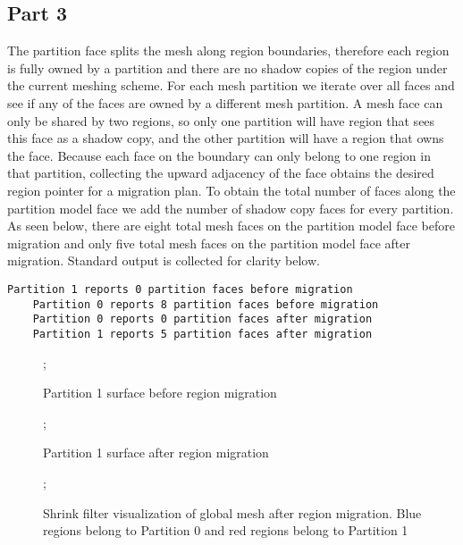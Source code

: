 \documentclass{article}
\begin{document}
\subsection{Part 3}
The partition face splits the mesh along region boundaries, therefore each region is fully owned by a partition and there are no shadow copies of the region under the current meshing scheme. For each mesh partition we iterate over all faces and see if any of the faces are owned by a different mesh partition. A mesh face can only be shared by two regions, so only one partition will have region that sees this face as a shadow copy, and the other partition will have a region that owns the face. Because each face on the boundary can only belong to one region in that partition, collecting the upward adjacency of the face obtains the desired region pointer for a migration plan. To obtain the total number of faces along the partition model face we add the number of shadow copy faces for every partition. As seen below, there are eight total mesh faces on the partition model face before migration and only five total mesh faces on the partition model face after migration. Standard output is collected for clarity below.
\begin{lstlisting}[frame = single]
    Partition 1 reports 0 partition faces before migration
    Partition 0 reports 8 partition faces before migration
    Partition 0 reports 0 partition faces after migration
    Partition 1 reports 5 partition faces after migration
\end{lstlisting}



\FloatBarrier
\begin{figure}
    ;
    \caption{Partition 1 surface before region migration}
\centering

\end{figure}
\begin{figure}
    ;
    \caption{Partition 1 surface after region migration}
\centering

\end{figure}
\begin{figure}
    ;
    \caption{Shrink filter visualization of global mesh after region migration. Blue regions belong to Partition 0 and red regions belong to Partition 1}
\centering

\end{figure}

\FloatBarrier

\lstset{linewidth = 16cm, xrightmargin = 0cm}
\lstlistoflistings

\end{document}
